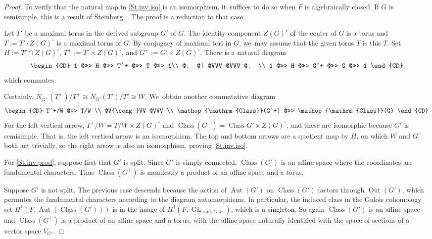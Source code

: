 \documentclass[JEP,XML,SOM,Unicode,NoFloatCountersInSection,published]{cedram}
\theoremstyle{definition}
\let\ic\circ
\DeclareMathOperator{\GL}{GL}
\DeclareMathOperator{\class}{Class}
\newcommand{\ClG}{\class(G)}
\DeclareMathOperator{\Aut}{Aut}
\DeclareMathOperator{\Out}{Out}
\DeclareMathOperator{\rank}{rank}
\begin{document}
\begin{proof}
To verify that the natural map in \eqref{St.inv.iso} is an isomorphism, it~suffices to do so when $F$ is algebraically closed. If $G$ is semisimple, this is a result of Steinberg, \cite[6.4]{St:reg}. The proof is a reduction to that case.

Let $T'$ be a maximal torus in the derived subgroup $G'$ of $G$. The identity component $Z(G)^\ic$ of the center of $G$ is a torus and $T := T' \cdot Z(G)^\ic$ is a maximal torus of $G$. By conjugacy of maximal tori in $G$, we~may assume that the given torus $T$ is this $T$. Set $H := T' \cap Z(G)^\ic$, $T^+ := T' \times Z(G)^\ic$, and $G^+ := G' \times Z(G)^\ic$. There is a natural diagram
\[
\begin{CD}
1 @>>> H @>>> T^+ @>>> T @>>> 1\\
@. @| @VVV @VVV @. \\
1 @>>> H @>>> G^+ @>>> G @>>> 1
\end{CD}
\]
which commutes.

Certainly, $N_{G^+}(T^+)/T^+ \cong N_{G'}(T')/T' \cong W$. We~obtain another commutative diagram
\[
\begin{CD}
T^+/W @>>> T/W \\
@V{\cong}VV @VVV \\
\class(G^+) @>>> \ClG
\end{CD}
\]
For the left vertical arrow, $T^+ / W = T/W \times Z(G)^\ic$ and $\class(G^+) = \class{G'} \times Z(G)^\ic$, and these are isomorphic because $G'$ is semisimple. That is, the left vertical arrow is an isomorphism. The top and bottom arrows are a quotient map by $H$, on which $W$ and $G^+$ both act trivially, so the right arrow is also an isomorphism, proving \eqref{St.inv.iso}.

For \eqref{St.inv.prod}, suppose first that $G'$ is split. Since $G'$ is
simply connected, $\class(G')$ is an affine space \cite[Th.\,6.1(b)]{St:reg}
where the coordinates are fundamental characters. Thus $\class(G^+)$ is
manifestly a product of an affine space and a torus.

Suppose $G'$ is not split. The previous case descends because the action of
$\Aut(G')$ on $\class(G')$ factors through $\Out(G')$, which permutes the
fundamental characters according to the diagram automorphisms. In
particular, the induced class in the Galois cohomology set $H^1(F,
\Aut(\class(G')))$ is in the image of $H^1(F, \GL_{\rank G, F})$, which is
a singleton. So again $\class(G')$ is an affine space and $\class(G^+)$
is a product of an affine space and a torus, with the affine space
naturally identified with the space of sections of a vector space $V_{G'}$.


\end{proof}
\end{document}
